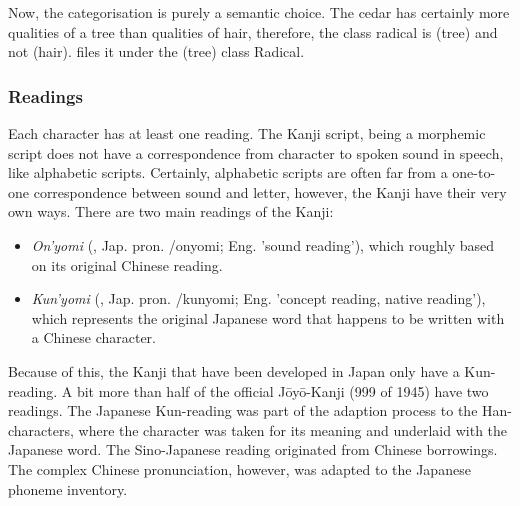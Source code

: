 Now, the categorisation is purely a semantic choice. The cedar has certainly more
qualities of a tree than qualities of hair, therefore, the class radical is
 (tree) and not  (hair).  files it 
under the  (tree) class Radical. %


\subsubsection{Readings}
\label{sec:readings}

Each character has at least one reading. The Kanji script, being a morphemic 
script does not have a correspondence from character to spoken sound in speech,
like alphabetic scripts. Certainly, alphabetic scripts are often far from a 
one-to-one correspondence between sound and letter, however, the Kanji have 
their very own ways. There are two main readings of the Kanji: \\ 
\begin{itemize}
  \item \emph{On'yomi} (, Jap. pron. /onyomi; 
        Eng. 'sound reading'), which roughly based on its original Chinese 
        reading.

  \item \emph{Kun'yomi} (, Jap. pron. /kunyomi; 
        Eng. 'concept reading, native reading'), which represents the original 
        Japanese word that happens to be written with a Chinese character. 
\end{itemize}
Because of this, the Kanji that have been developed in Japan only have a 
Kun-reading. A bit more than half of the official Jōyō-Kanji (999 of 1945)
have two readings.
The Japanese Kun-reading was part of the adaption process to the Han-characters,
where the character was taken for its meaning and underlaid with the Japanese
word. The Sino-Japanese reading originated from Chinese borrowings. The 
complex Chinese pronunciation, however, was adapted to the Japanese 
phoneme inventory.

